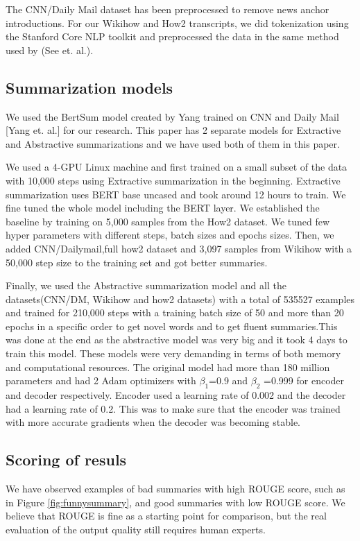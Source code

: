 \documentclass{article}
\begin{document}
The CNN/Daily Mail dataset has been preprocessed to remove news anchor introductions. For our Wikihow and How2 transcripts, we  did tokenization using the Stanford Core NLP toolkit and preprocessed the data in the same method used by (See et. al.).  


\subsection{Summarization models}

We used the BertSum model created by Yang trained on CNN and Daily Mail [Yang et. al.]  for our research. This paper has 2 separate models for Extractive and Abstractive summarizations and we have used both of them in this paper. 

We used a 4-GPU Linux machine and first trained on a small subset of the data with 10,000 steps using Extractive summarization in the beginning. Extractive summarization uses BERT base uncased and took around 12 hours to train. We fine tuned the whole model including the BERT layer. We established the baseline by training on 5,000 samples from the How2 dataset. We tuned few hyper parameters with different steps, batch sizes and epochs sizes. Then, we added CNN/Dailymail,full how2 dataset and 3,097 samples from Wikihow with a 50,000 step size to the training set and got better summaries. 

Finally, we used the Abstractive summarization model and all the datasets(CNN/DM, Wikihow and how2 datasets) with a total of 535527 examples and trained for 210,000 steps with a training batch size of 50 and more than 20 epochs in a specific order to get novel words and to get fluent summaries.This was done at the end as the abstractive model was very big and it took 4 days to train this model. These models were very demanding in terms of both memory and computational resources. The original model had more than 180 million parameters and had 2 Adam optimizers with $\beta_1$=0.9 and $\beta_2$ =0.999 for encoder and decoder respectively. Encoder used a learning rate of 0.002 and the decoder had a learning rate of 0.2. This was to make sure that the encoder was trained with more accurate gradients when the decoder was becoming stable.

\subsection{Scoring of resuls}
\label{Scoring}
We have observed examples of bad summaries with high ROUGE score, such as in Figure \ref{fig:funnysummary}, and good summaries with low ROUGE score. We believe that ROUGE is fine as a starting point for comparison, but the real evaluation of the output quality still requires human experts.
\end{document}
